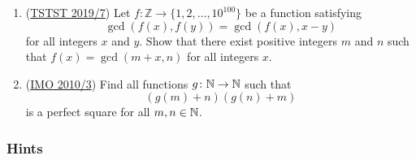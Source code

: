 \documentclass[11pt,paper=letter]{scrartcl}
\begin{document}
\begin{enumerate}[resume]
\item (\href{https://artofproblemsolving.com/community/c6h1863137p12608512}{TSTST 2019/7}) Let $f: \mathbb Z\to \{1, 2, \dots, 10^{100}\}$ be a function satisfying $$\gcd(f(x), f(y)) = \gcd(f(x), x-y)$$for all integers $x$ and $y$. Show that there exist positive integers $m$ and $n$ such that $f(x) = \gcd(m+x, n)$ for all integers $x$. \hints{\ref{h:16-1} \ref{h:16-2} \ref{h:16-3}}

\item (\href{https://artofproblemsolving.com/community/c6h356076p1935854}{IMO 2010/3}) Find all functions $g \colon \mathbb N \to \mathbb N$ such that \[(g(m) + n)(g(n) + m)\] is a perfect square for all $m, n \in \mathbb N$. \hints{\ref{h:17-1} \ref{h:17-2} \ref{h:17-3} \ref{h:17-4}}

\end{enumerate}



\newpage
\subsubsection*{Hints}
\end{document}
